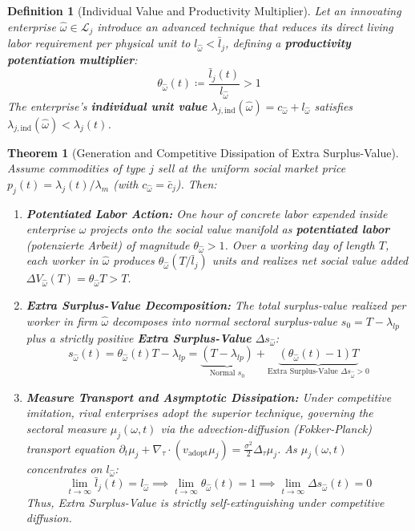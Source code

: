 \documentclass[11pt,a4paper]{article}
\newtheorem{definition}{Definition}[section]
\newtheorem{theorem}{Theorem}[section]
\begin{document}
\begin{definition}[Individual Value and Productivity Multiplier]
Let an innovating enterprise $\hat{\omega} \in \mathcal{L}_j$ introduce an advanced technique that reduces its direct living labor requirement per physical unit to $l_{\hat{\omega}} < \bar{l}_j$, defining a \textbf{productivity potentiation multiplier}:
\begin{equation}
    \theta_{\hat{\omega}}(t) \coloneqq \frac{\bar{l}_j(t)}{l_{\hat{\omega}}} > 1
\end{equation}
The enterprise's \textbf{individual unit value} $\lambda_{j,\text{ind}}(\hat{\omega}) = c_{\hat{\omega}} + l_{\hat{\omega}}$ satisfies $\lambda_{j,\text{ind}}(\hat{\omega}) < \lambda_j(t)$.
\end{definition}

\begin{theorem}[Generation and Competitive Dissipation of Extra Surplus-Value]
Assume commodities of type $j$ sell at the uniform social market price $p_j(t) = \lambda_j(t) / \lambda_m$ (with $c_{\hat{\omega}} = \bar{c}_j$). Then:
\begin{enumerate}[label=(\arabic*)]
    \item \textbf{Potentiated Labor Action:} One hour of concrete labor expended inside enterprise $\hat{\omega}$ projects onto the social value manifold as \textbf{potentiated labor} (\textit{potenzierte Arbeit}) of magnitude $\theta_{\hat{\omega}} > 1$. Over a working day of length $T$, each worker in $\hat{\omega}$ produces $\theta_{\hat{\omega}} (T / \bar{l}_j)$ units and realizes net social value added $\Delta V_{\hat{\omega}}(T) = \theta_{\hat{\omega}} T > T$.
    \item \textbf{Extra Surplus-Value Decomposition:} The total surplus-value realized per worker in firm $\hat{\omega}$ decomposes into normal sectoral surplus-value $s_0 = T - \lambda_{lp}$ plus a strictly positive \textbf{Extra Surplus-Value} $\Delta s_{\hat{\omega}}$:
    \begin{equation}
        s_{\hat{\omega}}(t) = \theta_{\hat{\omega}}(t) T - \lambda_{lp} = \underbrace{\left(T - \lambda_{lp}\right)}_{\text{Normal } s_0} + \underbrace{\left(\theta_{\hat{\omega}}(t) - 1\right) T}_{\text{Extra Surplus-Value } \Delta s_{\hat{\omega}} > 0}
    \end{equation}
    \item \textbf{Measure Transport and Asymptotic Dissipation:} Under competitive imitation, rival enterprises adopt the superior technique, governing the sectoral measure $\mu_j(\omega, t)$ via the advection-diffusion (Fokker-Planck) transport equation $\partial_t \mu_j + \nabla_\tau \cdot (v_{\text{adopt}} \mu_j) = \frac{\sigma^2}{2}\Delta_\tau \mu_j$. As $\mu_j(\omega, t)$ concentrates on $l_{\hat{\omega}}$:
    \begin{equation}
        \lim_{t \to \infty} \bar{l}_j(t) = l_{\hat{\omega}} \implies \lim_{t \to \infty} \theta_{\hat{\omega}}(t) = 1 \implies \lim_{t \to \infty} \Delta s_{\hat{\omega}}(t) = 0
    \end{equation}
    Thus, Extra Surplus-Value is strictly self-extinguishing under competitive diffusion.
\end{enumerate}
\end{theorem}
\end{document}
